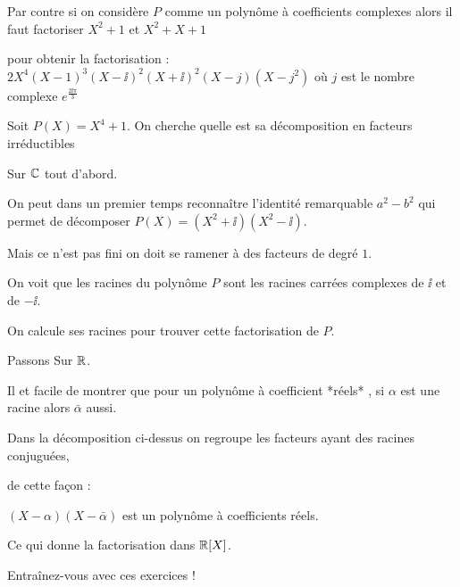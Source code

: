 \change

Par contre si on considère $P$ comme un polynôme à coefficients complexes
alors il faut factoriser  $X^2+1$ et $X^2+X+1$

pour  obtenir la factorisation :
$2X^4(X-1)^3(X-\ii)^2(X+\ii)^2(X-j)(X-j^2)$ 
où $j$ est le nombre complexe $e^{\frac{2\ii\pi}{3}}$

\diapo

Soit $P(X)=X^4+1$. On cherche quelle est sa décomposition en facteurs irréductibles

\change

Sur $\mathbb{C}$ tout d'abord.

\change

On peut dans un premier temps reconnaître l'identité remarquable $a^2-b^2$ qui permet de
décomposer $P(X)=(X^2+\ii)(X^2-\ii)$.

\change

Mais ce n'est pas fini on doit se ramener à des facteurs de degré $1$.

On voit que les racines du polynôme $P$ sont les racines carrées complexes de $\ii$ et de $-\ii$.

\change

On calcule ses racines pour trouver cette factorisation de $P$.


\change

Passons  Sur $\mathbb{R}$. 

\change

Il et facile de montrer que pour un polynôme à coefficient *réels*
, si $\alpha$ est une racine
alors $\bar \alpha$ aussi. 

\change

Dans la décomposition ci-dessus on regroupe les facteurs ayant des racines conjuguées, 

\change

de cette façon :

$(X-\alpha)(X-\bar \alpha)$ est un polynôme à coefficients réels.


Ce qui donne la factorisation dans $\mathbb{R}[X]$.

\diapo

Entraînez-vous avec ces exercices !



